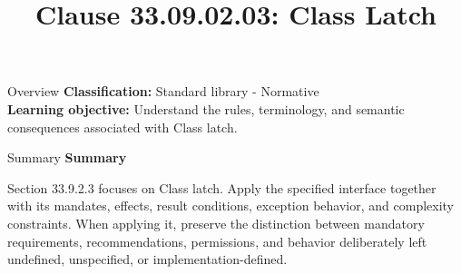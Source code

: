 \documentclass[10pt,letterpaper]{article}
\title{Clause 33.09.02.03: Class Latch}
\author{}
\date{}
\begin{document}
\maketitle
\begin{CornellOverviewBox}{Overview}
\textbf{Classification:} Standard library - Normative\\[2pt]
\textbf{Learning objective:} Understand the rules, terminology, and semantic consequences associated with Class latch.
\end{CornellOverviewBox}\begin{CornellSummaryBox}{Summary}
{\sffamily\bfseries\color{Accent} Summary}\par\vspace{3pt}Section 33.9.2.3 focuses on Class latch. Apply the specified interface together with its mandates, effects, result conditions, exception behavior, and complexity constraints. When applying it, preserve the distinction between mandatory requirements, recommendations, permissions, and behavior deliberately left undefined, unspecified, or implementation-defined.
\end{CornellSummaryBox}
\end{document}

